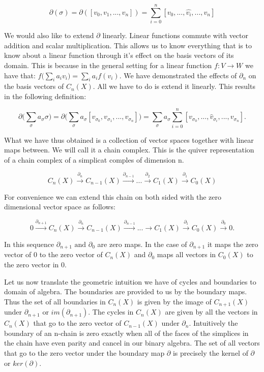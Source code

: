 $$ \partial(\sigma) = \partial([v_0, v_1, ..., v_n]) = \sum_{i=0}^{n}[v_0, ... , \hat{v_i}, ..., v_n] $$

We would also like to extend $\partial$ linearly. Linear functions commute with vector addition and scalar multiplication. This allows us to know everything that is to know about a linear function through it's effect on the basis vectors of its domain. This is because in the general setting for a linear function $f : V \to W$ we have that: $ f\big(\sum_{i}{a_iv_i}\big) = \sum_i{a_if(v_i)} $. We have demonstrated the effects of $\partial_n$ on the basis vectors of $C_n(X)$. All we have to do is extend it linearly. This results in the following definition:


$$ \partial\bigg(\sum_{\sigma}a_{\sigma}\sigma\bigg) = \partial\bigg(\sum_{\sigma}{a_{\sigma}[v_{\sigma_0}, v_{\sigma_1}, ..., v_{\sigma_n}]}\bigg) = \sum_{\sigma}{a_{\sigma} \sum_{i=0}^{n}[v_{\sigma_0},..., \hat{v}_{\sigma_i}, ..., v_{\sigma_n}]} .$$


What we have thus obtained is a collection of vector spaces together with linear maps between. We will call it a chain complex. This is the quiver representation of a chain complex of a simplicat comples of dimension n.


$$ C_n(X) \overset{\partial_n}{\longrightarrow} C_{n-1}(X) \overset{\partial_{n-1}}{\longrightarrow} ... \overset{\partial_2}{\longrightarrow} C_1(X) \overset{\partial_1}{\longrightarrow} C_0(X) $$

For convenience we can extend this chain on both sided with the zero dimensional vector space as follows:

$$ 0 \overset{\partial_{n+1}}{\longrightarrow} C_n(X) \overset{\partial_{n}}{\longrightarrow} C_{n-1}(X) \overset{\partial_{n-1}}{\longrightarrow} ... \longrightarrow C_1(X) \overset{\partial_1}{\longrightarrow} C_0(X) \overset{\partial_0}{\longrightarrow} 0. $$

In this sequence $\partial_{n+1} \text{ and } \partial_{0}$ are zero maps. In the case of $\partial_{n+1}$ it maps the zero vector of $0$ to the zero vector of $C_n(X)$ and $\partial_0$ maps all vectors in $C_0(X)$ to the zero vector in $0$.

Let us now translate the geometric intuition we have of cycles and boundaries to domain of algebra. The boundaries are provided to us by the boundary maps. Thus the set of all boundaries in $C_n(X)$ is given by the image of $C_{n+1}(X)$ under $\partial_{n+1}$ or $im(\partial_{n+1})$. The cycles in $C_n(X)$ are given by all the vectors in $C_n(X)$ that go to the zero vector of $C_{n-1}(X)$ under $\partial_n$. Intuitively the boundary of an n-chain is zero exactly when all of the faces of the simplices in the chain have even parity and cancel in our binary algebra. The set of all vectors that go to the zero vector under the boundary map $\partial$ is precisely the kernel of $\partial$ or $ker(\partial)$.

